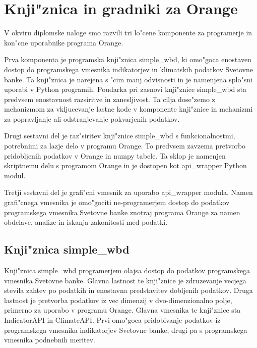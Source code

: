 
\chapter{Knji"znica in gradniki za Orange}

V okviru diplomske naloge smo razvili tri lo"cene komponente za programerje in
kon"cne uporabnike programa Orange. 

Prva komponenta je programska knji"znica simple\_wbd, ki
omo"goca enostaven dostop do programskega vmesnika indikatorjev in klimatskih
podatkov Svetovne banke. Ta knji"znica je narejena s "cim manj odvisnosti in je 
namenjena splo"sni uporabi v Python programih. Poudarka pri zasnovi knji"znice 
simple\_wbd sta predvsem enostavnost razsiritve in zanesljivost. Ta cilja
dose"zemo z mehanizmom za vkljucevanje lastne kode v komponente knji"znice
in mehanizmi za popravljanje ali odstranjevanje pokvarjenih podatkov.

Drugi sestavni del je raz"siritev knji"znice simple\_wbd s funkcionalnostmi, 
potrebnimi za lazje delo v programu Orange. To predvsem zavzema pretvorbo
pridobljenih podatkov v Orange in numpy tabele. Ta sklop je namenjen skriptnemu
delu s programom Orange in je dostopen kot api\_wrapper Python modul. 

Tretji sestavni del je grafi"cni vmesnik za uporabo api\_wrapper modula. Namen
grafi"cnega vmesnika je omo"gociti ne-programerjem dostop do podatkov 
programskega vmesnika Svetovne banke znotraj programa Orange za namen obdelave,
analize in iskanja zakonitosti med podatki.

\section{Knji"znica simple\_wbd}

Knji"znica simple\_wbd programerjem olajsa dostop do podatkov programskega 
vmesnika Svetovne banke. Glavna lastnost te knji"znice je zdruzevanje vecjega 
stevila zahtev po podatkih in enostavna predstavitev dobljenih podatkov. 
Druga lastnost je pretvorba podatkov iz vec dimenzij v dvo-dimenzionalno polje,
primerno za uporabo v programu Orange. Glavna vmesnika te knji"znice sta 
IndicatorAPI in ClimateAPI. Prvi omo"goca pridobivanje podatkov iz programskega 
vmesnika indikatorjev Svetovne banke, drugi pa s programskega vmesnika
podnebnih meritev.





